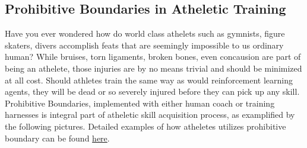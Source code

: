 \documentclass[journal]{IEEEtran}
\begin{document}
\subsection{Prohibitive Boundaries in Atheletic Training}
Have you ever wondered how do world class athelets such as gymnists, figure skaters, divers accomplish feats that are seemingly impossible to us ordinary human?  While bruises, torn ligaments, broken bones, even concausion are part of being an athelete, those injuries are by no means trivial and should be minimized at all cost. Should athletes train the same way as would reinforcement learning agents, they will be dead or so severely injured before they can pick up any skill. Prohibitive Boundaries, implemented with either human coach or training harnesses is integral part of atheletic skill acquisition process, as examplified by the following pictures. Detailed examples of how atheletes utilizes prohibitive boundary can be found \href{https://www.youtube.com/playlist?list=PLyqL4-20ZuTRo-DysDQBGDnwZsrySXP4b}{here}.
\end{document}
